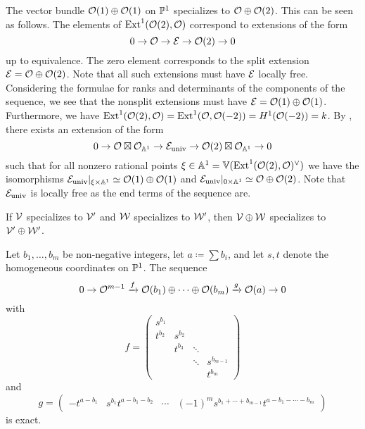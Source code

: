 \begin{example}
	The vector bundle $\mathcal{O}(1)\oplus \mathcal{O}(1)$ on $\mathbb{P}^1$ specializes to $\mathcal{O}\oplus \mathcal{O}(2)$.
	This can be seen as follows.
	The elements of $\operatorname{Ext}^1(\mathcal{O}(2),\mathcal{O})$ correspond to extensions of the form
	\[ 0 \to \mathcal{O} \to \mathcal{E} \to \mathcal{O}(2) \to 0\]
	up to equivalence. The zero element corresponds to the split extension $\mathcal{E} = \mathcal{O} \oplus \mathcal{O}(2)$.
	Note that all such extensions must have $\mathcal{E}$ locally free.
	Considering the formulae for ranks and determinants of the components of the sequence, we see that the nonsplit extensions must have $\mathcal{E}=\mathcal{O}(1)\oplus\mathcal{O}(1)$.
	Furthermore, we have $\operatorname{Ext}^1(\mathcal{O}(2),\mathcal{O}) = \operatorname{Ext}^1(\mathcal{O},\mathcal{O}(-2))=H^1(\mathcal{O}(-2))=k$.
	By , there exists an extension of the form
	\[0 \to \mathcal{O}\boxtimes \mathcal{O}_{\mathbb{A}^1} \to \mathcal{E}_{\text{univ}} \to \mathcal{O}(2)\boxtimes \mathcal{O}_{\mathbb{A}^1} \to 0\]
	such that for all nonzero rational points $\xi\in\mathbb{A}^1 = \mathbb{V}(\operatorname{Ext}^1(\mathcal{O}(2),\mathcal{O})^\vee)$ we have the isomorphisms $\mathcal{E}_{\text{univ}}|_{\xi \times \mathbb{A}^1} \simeq \mathcal{O}(1)\oplus\mathcal{O}(1)$ and $\mathcal{E}_{\text{univ}}|_{0\times \mathbb{A}^1} \simeq \mathcal{O} \oplus \mathcal{O}(2)$. Note that $\mathcal{E}_{\text{univ}}$ is locally free as the end terms of the sequence are.
\end{example}

\begin{remark} \label{rem:specialization-sum}
	If $\mathcal{V}$ specializes to $\mathcal{V}'$ and $\mathcal{W}$ specializes to $\mathcal{W}'$, then $\mathcal{V}\oplus\mathcal{W}$ specializes to $\mathcal{V}'\oplus\mathcal{W}'$.
\end{remark}

\begin{remark} \label{rem:exact-sequence-exists}
	Let $b_1,\dotsc,b_m$ be non-negative integers, let $a\coloneqq \sum b_i$, and let $s,t$ denote the homogeneous coordinates on $\mathbb{P}^1$. The sequence
	\[ 0 \to \mathcal{O}^{m-1} \xrightarrow{f} \mathcal{O}(b_1)\oplus \dotsb \oplus \mathcal{O}(b_m) \xrightarrow{g} \mathcal{O}(a) \to 0 \]
	with \[
	f = \begin{pmatrix}
	s^{b_1}&        &	   &           \\
	t^{b_2}& s^{b_2}&      &           \\
	       & t^{b_3}&\ddots&           \\
	       &        &\ddots&s^{b_{m-1}}\\
	       &        &      &t^{b_m}
	\end{pmatrix} 
	\]
	and
	\[
	g = \begin{pmatrix}
	-t^{a-b_1} & s^{b_1}t^{a-b_1-b_2} & \cdots & (-1)^{m} s^{b_1 + \dotsb + b_{m-1}}t^{a-b_1-\dotsb-b_m}
	\end{pmatrix}
	\]
	is exact.
\end{remark}

